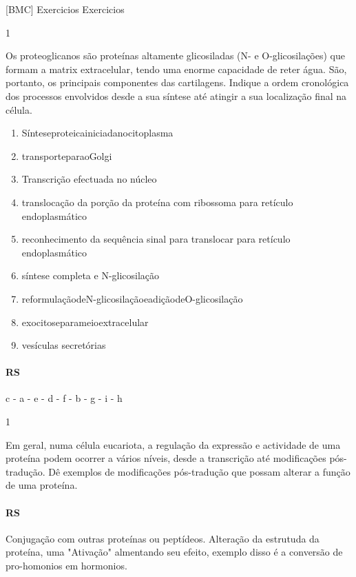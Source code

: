 \documentclass[\mainfilename]{subfiles}
\begin{document}
[BMC]
{Exercicios}
{Exercicios}

\begin{questionBox}1{}
    
    Os proteoglicanos são proteínas altamente glicosiladas (N- e O-glicosilações) que formam a matrix extracelular, tendo uma enorme capacidade de reter água. São, portanto, os principais componentes das cartilagens. Indique a ordem cronológica dos processos envolvidos desde a sua síntese até atingir a sua localização final na célula.

    \begin{enumerate}[label=\alph{enumi}. ]
        \item Sínteseproteicainiciadanocitoplasma
        \item transporteparaoGolgi
        \item Transcrição efectuada no núcleo
        \item translocação da porção da proteína com ribossoma para retículo endoplasmático
        \item reconhecimento da sequência sinal para translocar para retículo endoplasmático
        \item síntese completa e N-glicosilação
        \item reformulaçãodeN-glicosilaçãoeadiçãodeO-glicosilação
        \item exocitoseparameioextracelular
        \item vesículas secretórias
    \end{enumerate}

    \paragraph*{RS}
    c - a - e - d - f - b - g - i - h
    
\end{questionBox}

\begin{questionBox}1{}
    
    Em geral, numa célula eucariota, a regulação da expressão e actividade de uma proteína podem ocorrer a vários níveis, desde a transcrição até modificações pós- tradução. Dê exemplos de modificações pós-tradução que possam alterar a função de uma proteína.

    \paragraph*{RS}
    Conjugação com outras proteínas ou peptídeos.
    Alteração da estrutuda da proteína, uma "Ativação" almentando seu efeito, exemplo disso é a conversão de pro-homonios em hormonios.
    
\end{questionBox}
\end{document}
